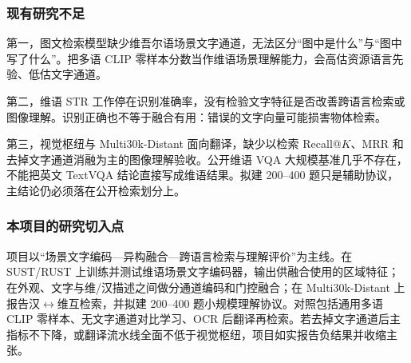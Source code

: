 \subsubsection{现有研究不足}

第一，图文检索模型缺少维吾尔语场景文字通道，无法区分“图中是什么”与“图中写了什么”。把多语 CLIP 零样本分数当作维语场景理解能力，会高估资源语言先验、低估文字通道。

第二，维语 STR 工作停在识别准确率，没有检验文字特征是否改善跨语言检索或图像理解。识别正确也不等于融合有用：错误的文字向量可能损害物体检索。

第三，视觉枢纽与 Multi30k-Distant 面向翻译，缺少以检索 Recall@$K$、MRR 和去掉文字通道消融为主的图像理解验收。公开维语 VQA 大规模基准几乎不存在，不能把英文 TextVQA 结论直接写成维语结果。拟建 200--400 题只是辅助协议，主结论仍必须落在公开检索划分上。

\subsubsection{本项目的研究切入点}

项目以“场景文字编码—异构融合—跨语言检索与理解评价”为主线。在 SUST/RUST 上训练并测试维语场景文字编码器，输出供融合使用的区域特征；在外观、文字与维/汉描述之间做分通道编码和门控融合；在 Multi30k-Distant 上报告汉$\leftrightarrow$维互检索，并拟建 200--400 题小规模理解协议。对照包括通用多语 CLIP 零样本、无文字通道对比学习、OCR 后翻译再检索。若去掉文字通道后主指标不下降，或翻译流水线全面不低于视觉枢纽，项目如实报告负结果并收缩主张。
